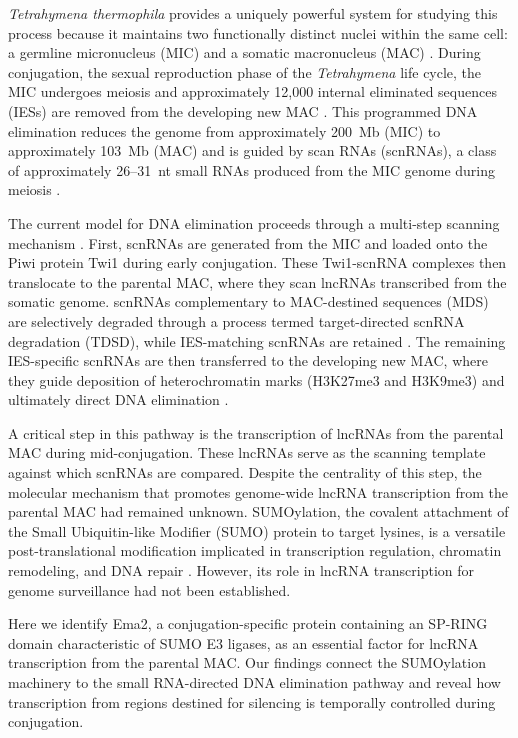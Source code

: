 \documentclass[11pt,a4paper]{article}
\begin{document}
\textit{Tetrahymena thermophila} provides a uniquely powerful system for studying this process because it maintains two functionally distinct nuclei within the same cell: a germline micronucleus (MIC) and a somatic macronucleus (MAC) \citep{Karrer2012, Chalker2011}. During conjugation, the sexual reproduction phase of the \textit{Tetrahymena} life cycle, the MIC undergoes meiosis and approximately 12,000 internal eliminated sequences (IESs) are removed from the developing new MAC \citep{Mochizuki2010, Yao2003}. This programmed DNA elimination reduces the genome from approximately 200~Mb (MIC) to approximately 103~Mb (MAC) and is guided by scan RNAs (scnRNAs), a class of approximately 26--31~nt small RNAs produced from the MIC genome during meiosis \citep{Mochizuki2002, Liu2007}.

The current model for DNA elimination proceeds through a multi-step scanning mechanism \citep{Mochizuki2002, Aronica2008, Noto2015}. First, scnRNAs are generated from the MIC and loaded onto the Piwi protein Twi1 during early conjugation. These Twi1-scnRNA complexes then translocate to the parental MAC, where they scan lncRNAs transcribed from the somatic genome. scnRNAs complementary to MAC-destined sequences (MDS) are selectively degraded through a process termed target-directed scnRNA degradation (TDSD), while IES-matching scnRNAs are retained \citep{Mochizuki2004, Noto2015}. The remaining IES-specific scnRNAs are then transferred to the developing new MAC, where they guide deposition of heterochromatin marks (H3K27me3 and H3K9me3) and ultimately direct DNA elimination \citep{Liu2007, Taverna2013}.

A critical step in this pathway is the transcription of lncRNAs from the parental MAC during mid-conjugation. These lncRNAs serve as the scanning template against which scnRNAs are compared. Despite the centrality of this step, the molecular mechanism that promotes genome-wide lncRNA transcription from the parental MAC had remained unknown. SUMOylation, the covalent attachment of the Small Ubiquitin-like Modifier (SUMO) protein to target lysines, is a versatile post-translational modification implicated in transcription regulation, chromatin remodeling, and DNA repair \citep{Gareau2010, Flotho2013, Raman2013}. However, its role in lncRNA transcription for genome surveillance had not been established.

Here we identify Ema2, a conjugation-specific protein containing an SP-RING domain characteristic of SUMO E3 ligases, as an essential factor for lncRNA transcription from the parental MAC. Our findings connect the SUMOylation machinery to the small RNA-directed DNA elimination pathway and reveal how transcription from regions destined for silencing is temporally controlled during conjugation.
\end{document}
